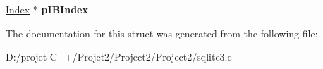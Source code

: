 \begin{DoxyCompactItemize}
\begin{tabbing}
\end{tabbing}\item 
\mbox{\label{struct_src_list_1_1_src_list__item_a33f82c4d70c773856d55a5ebe9b1cc8c}} 
\mbox{\hyperlink{struct_index}{Index}} $\ast$ {\bfseries p\+I\+B\+Index}
\end{DoxyCompactItemize}


The documentation for this struct was generated from the following file\+:\begin{DoxyCompactItemize}
\item 
D\+:/projet C++/\+Projet2/\+Project2/\+Project2/sqlite3.\+c\end{DoxyCompactItemize}
